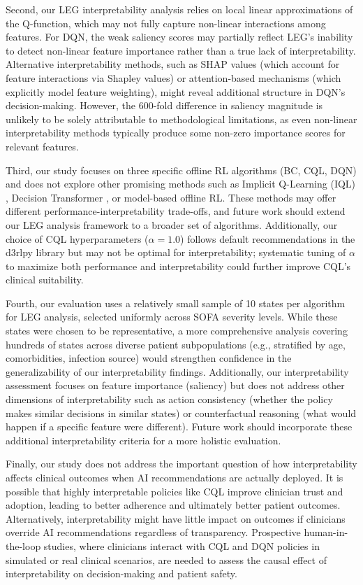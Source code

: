 Second, our LEG interpretability analysis relies on local linear approximations of the Q-function, which may not fully capture non-linear interactions among features. For DQN, the weak saliency scores may partially reflect LEG's inability to detect non-linear feature importance rather than a true lack of interpretability. Alternative interpretability methods, such as SHAP values \citep{lundberg2017shap} (which account for feature interactions via Shapley values) or attention-based mechanisms (which explicitly model feature weighting), might reveal additional structure in DQN's decision-making. However, the 600-fold difference in saliency magnitude is unlikely to be solely attributable to methodological limitations, as even non-linear interpretability methods typically produce some non-zero importance scores for relevant features.

Third, our study focuses on three specific offline RL algorithms (BC, CQL, DQN) and does not explore other promising methods such as Implicit Q-Learning (IQL) \citep{kostrikov2021iql}, Decision Transformer \citep{chen2021decision_transformer}, or model-based offline RL. These methods may offer different performance-interpretability trade-offs, and future work should extend our LEG analysis framework to a broader set of algorithms. Additionally, our choice of CQL hyperparameters ($\alpha = 1.0$) follows default recommendations in the d3rlpy library but may not be optimal for interpretability; systematic tuning of $\alpha$ to maximize both performance and interpretability could further improve CQL's clinical suitability.

Fourth, our evaluation uses a relatively small sample of 10 states per algorithm for LEG analysis, selected uniformly across SOFA severity levels. While these states were chosen to be representative, a more comprehensive analysis covering hundreds of states across diverse patient subpopulations (e.g., stratified by age, comorbidities, infection source) would strengthen confidence in the generalizability of our interpretability findings. Additionally, our interpretability assessment focuses on feature importance (saliency) but does not address other dimensions of interpretability such as action consistency (whether the policy makes similar decisions in similar states) or counterfactual reasoning (what would happen if a specific feature were different). Future work should incorporate these additional interpretability criteria for a more holistic evaluation.

Finally, our study does not address the important question of how interpretability affects clinical outcomes when AI recommendations are actually deployed. It is possible that highly interpretable policies like CQL improve clinician trust and adoption, leading to better adherence and ultimately better patient outcomes. Alternatively, interpretability might have little impact on outcomes if clinicians override AI recommendations regardless of transparency. Prospective human-in-the-loop studies, where clinicians interact with CQL and DQN policies in simulated or real clinical scenarios, are needed to assess the causal effect of interpretability on decision-making and patient safety.


